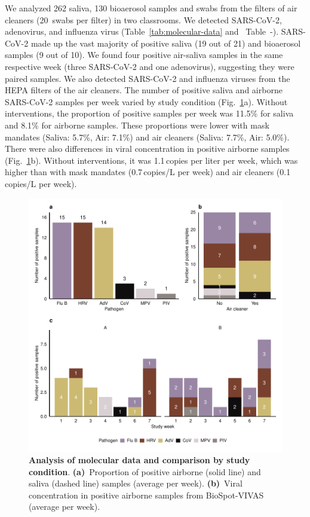 \documentclass[fleqn,11pt]{wlscirep}
\begin{document}
We analyzed 262 saliva, 130 bioaerosol samples and swabs from the filters of air cleaners (20~swabs per filter) in two classrooms. We detected SARS-CoV-2, adenovirus, and influenza virus (Table~\ref{tab:molecular-data} and \supp~Table~-). SARS-CoV-2 made up the vast majority of positive saliva (19 out of 21) and bioaerosol samples (9 out of 10). We found four positive air-saliva samples in the same respective week (three SARS-CoV-2 and one adenovirus), suggesting they were paired samples. We also detected SARS-CoV-2 and influenza viruses from the HEPA filters of the air cleaners. The number of positive saliva and airborne SARS-CoV-2 samples per week varied by study condition (Fig.~\ref{fig:molecular-descriptives}a). Without interventions, the proportion of positive samples per week was 11.5\% for saliva and 8.1\% for airborne samples. These proportions were lower with mask mandates (Saliva: 5.7\%, Air: 7.1\%) and air cleaners (Saliva: 7.7\%, Air: 5.0\%). There were also differences in viral concentration in positive airborne samples (Fig.~\ref{fig:molecular-descriptives}b). Without interventions, it was 1.1\,copies per liter per week, which was higher than with mask mandates (0.7\,copies/L per week) and air cleaners (0.1\,copies/L per week). 


\begin{figure}[!htpb]
    \centering
    \includegraphics{../../results/mol-data/descriptives.pdf}
    \caption{\textbf{Analysis of molecular data and comparison by study condition}. \textbf{(a)}~Proportion of positive airborne (solid line) and saliva (dashed line) samples (average per week). \textbf{(b)}~Viral concentration in positive airborne samples from BioSpot-VIVAS (average per week).}
    \label{fig:molecular-descriptives}
\end{figure}
\end{document}
